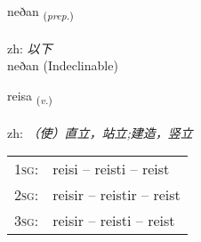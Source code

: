 \documentclass[frontgrid, backgrid]{flacards}\usepackage[]{graphicx}\usepackage[]{color}
\begin{document}

\renewcommand{\flhead}{\vskip5pt \fboxsep=0pt {\small\bfseries\footnotesize Forsetning | 介词}}
\renewcommand{\fcfoot}{\vskip5pt \fboxsep=0pt \hspace{2pt}{\small\bfseries\footnotesize 2K}}

\renewcommand{\blhead}{\vskip5pt {\small\bfseries\footnotesize Forsetning | 介词 }}
\renewcommand{\bcfoot}{\vskip5pt \hspace{2pt}{\small\bfseries\footnotesize 2K}}


{neðan \small{\textsubscript{(\textit{prep.})}} \\[1ex]
\textphonetic{[nɛːðan]} \\
zh: \emph{以下} \\  [2ex]
neðan (Indeclinable)}

\renewcommand{\flhead}{\vskip5pt \fboxsep=0pt {\small\bfseries\footnotesize Sagnorð | 动词}}
\renewcommand{\fcfoot}{\vskip5pt \fboxsep=0pt \hspace{2pt}{\small\bfseries\footnotesize 2K}}

\renewcommand{\blhead}{\vskip5pt {\small\bfseries\footnotesize Sagnorð | 动词 }}
\renewcommand{\bcfoot}{\vskip5pt \hspace{2pt}{\small\bfseries\footnotesize 2K}}


{reisa \small{\textsubscript{(\textit{v.})}} \\[1ex] %
\textphonetic{[reiːsa]} \\
zh: \emph{（使）直立，站立;建造，竖立} \\  [2ex]
\renewcommand*{\arraystretch}{0.8}
\begin{tabular}{p{1cm}l}
\textsc{1sg}: & reisi -- reisti -- reist \\ 
\textsc{2sg}: & reisir -- reistir -- reist \\ 
\textsc{3sg}: & reisir -- reisti -- reist \\ 
\end{tabular}
}

\renewcommand{\flhead}{\vskip5pt \fboxsep=0pt {\small\bfseries\footnotesize Nafnorð | 名词}}
\renewcommand{\fcfoot}{\vskip5pt \fboxsep=0pt \hspace{2pt}{\small\bfseries\footnotesize 2K}}
\end{document}
